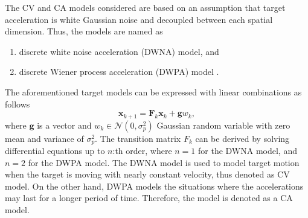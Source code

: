 \documentclass[english, 12pt, a4paper, elec, utf8, a-1b, online]{aaltothesis}
\renewcommand{\vec}[1]{\mathbf{#1}}
\newcommand{\normal}[2]{\mathcal{N}\left(#1, #2 \right)}
\begin{document}
The CV and CA models considered are based on an assumption that target acceleration is white Gaussian noise and decoupled between each spatial dimension.
Thus, the models are named as
\begin{enumerate}
    \item discrete white noise acceleration (DWNA) model, and
    \item discrete Wiener process acceleration (DWPA) model \cite{BarShalom2001}.
\end{enumerate}
The aforementioned target models can be expressed with linear combinations as follows 
\begin{equation}
    \vec{x}_{k+1} = \mathbf{F}_k \vec{x}_k + \vec{g} w_k,
\end{equation}
where $\vec{g}$ is a vector and $w_k \in \normal{0}{\sigma_p^2}$ Gaussian random variable with zero mean and variance of $\sigma_p^2$.
The transition matrix $F_k$ can be derived by solving differential equations up to $n$:th order, where $n=1$ for the DWNA model, and $n=2$ for the DWPA model.  
The DWNA model is used to model target motion when the target is moving with nearly constant velocity, thus denoted as CV model.
On the other hand, DWPA models the situations where the accelerations may last for a longer period of time. 
Therefore, the model is denoted as a CA model.
\end{document}
